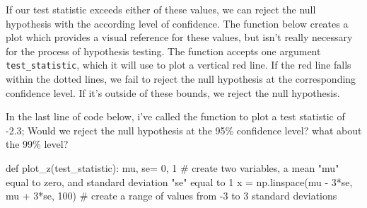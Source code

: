 \documentclass[
  letterpaper,
  DIV=11,
  numbers=noendperiod]{scrreprt}
\newenvironment{Shaded}{\begin{snugshade}}{\end{snugshade}}
\newcommand{\CommentTok}[1]{\textcolor[rgb]{0.37,0.37,0.37}{#1}}
\newcommand{\DecValTok}[1]{\textcolor[rgb]{0.68,0.00,0.00}{#1}}
\newcommand{\KeywordTok}[1]{\textcolor[rgb]{0.00,0.23,0.31}{#1}}
\newcommand{\NormalTok}[1]{\textcolor[rgb]{0.00,0.23,0.31}{#1}}
\newcommand{\OperatorTok}[1]{\textcolor[rgb]{0.37,0.37,0.37}{#1}}
\begin{document}
If our test statistic exceeds either of these values, we can reject the
null hypothesis with the according level of confidence. The function
below creates a plot which provides a visual reference for these values,
but isn't really necessary for the process of hypothesis testing. The
function accepts one argument \texttt{test\_statistic}, which it will
use to plot a vertical red line. If the red line falls within the dotted
lines, we fail to reject the null hypothesis at the corresponding
confidence level. If it's outside of these bounds, we reject the null
hypothesis.

In the last line of code below, i've called the function to plot a test
statistic of -2.3; Would we reject the null hypothesis at the 95\%
confidence level? what about the 99\% level?

\begin{Shaded}
\begin{Highlighting}[]
\KeywordTok{def}\NormalTok{ plot\_z(test\_statistic):}
\NormalTok{    mu, se}\OperatorTok{=} \DecValTok{0}\NormalTok{, }\DecValTok{1} \CommentTok{\# create two variables, a mean "mu" equal to zero, and standard deviation "se" equal to 1}
\NormalTok{    x }\OperatorTok{=}\NormalTok{ np.linspace(mu }\OperatorTok{{-}} \DecValTok{3}\OperatorTok{*}\NormalTok{se, mu }\OperatorTok{+} \DecValTok{3}\OperatorTok{*}\NormalTok{se, }\DecValTok{100}\NormalTok{) }\CommentTok{\# create a range of values from {-}3 to 3 standard deviations}


\end{Highlighting}
\end{Shaded}
\end{document}
